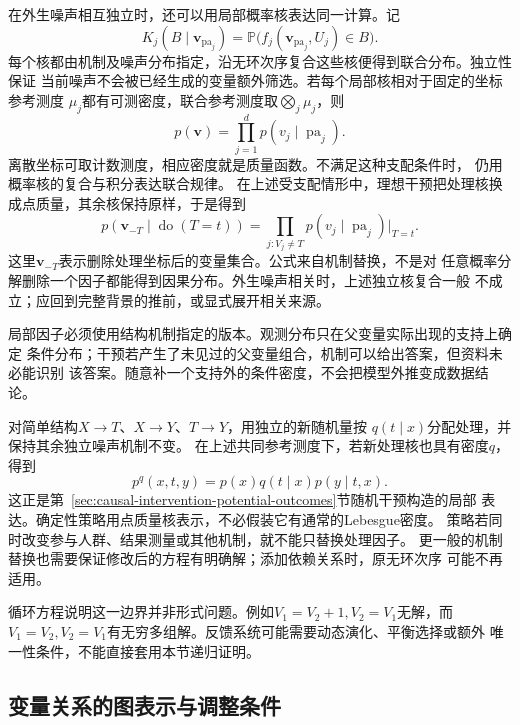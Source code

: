 在外生噪声相互独立时，还可以用局部概率核表达同一计算。记
\[
  K_j(B\mid\bm v_{\operatorname{pa}_j})
  =
  \mathbb P\bigl(f_j(\bm v_{\operatorname{pa}_j},U_j)\in B\bigr).
\]
每个核都由机制及噪声分布指定，沿无环次序复合这些核便得到联合分布。独立性保证
当前噪声不会被已经生成的变量额外筛选。若每个局部核相对于固定的坐标参考测度
\(\mu_j\)都有可测密度，联合参考测度取\(\bigotimes_j\mu_j\)，则
\[
  p(\bm v)=\prod_{j=1}^d p(v_j\mid\operatorname{pa}_j).
\]
离散坐标可取计数测度，相应密度就是质量函数。不满足这种支配条件时，
仍用概率核的复合与积分表达联合规律。
在上述受支配情形中，理想干预把处理核换成点质量，其余核保持原样，于是得到
\begin{equation}
  p(\bm v_{-T}\mid\operatorname{do}(T=t))
  =
  \prod_{j:V_j\ne T}
  p(v_j\mid\operatorname{pa}_j)\big|_{T=t}.
  \label{eq:causal-truncated-factorization}
\end{equation}
这里\(\bm v_{-T}\)表示删除处理坐标后的变量集合。公式来自机制替换，不是对
任意概率分解删除一个因子都能得到因果分布。外生噪声相关时，上述独立核复合一般
不成立；应回到完整背景的推前，或显式展开相关来源。

局部因子必须使用结构机制指定的版本。观测分布只在父变量实际出现的支持上确定
条件分布；干预若产生了未见过的父变量组合，机制可以给出答案，但资料未必能识别
该答案。随意补一个支持外的条件密度，不会把模型外推变成数据结论。

对简单结构\(X\to T\)、\(X\to Y\)、\(T\to Y\)，用独立的新随机量按
\(q(t\mid x)\)分配处理，并保持其余独立噪声机制不变。
在上述共同参考测度下，若新处理核也具有密度\(q\)，得到
\begin{equation}
  p^q(x,t,y)=p(x)q(t\mid x)p(y\mid t,x).
  \label{eq:causal-stochastic-intervention}
\end{equation}
这正是第~\ref{sec:causal-intervention-potential-outcomes}节随机干预构造的局部
表达。确定性策略用点质量核表示，不必假装它有通常的Lebesgue密度。
策略若同时改变参与人群、结果测量或其他机制，就不能只替换处理因子。
更一般的机制替换也需要保证修改后的方程有明确解；添加依赖关系时，原无环次序
可能不再适用。

循环方程说明这一边界并非形式问题。例如\(V_1=V_2+1,V_2=V_1\)无解，而
\(V_1=V_2,V_2=V_1\)有无穷多组解。反馈系统可能需要动态演化、平衡选择或额外
唯一性条件，不能直接套用本节递归证明。

\subsection{变量关系的图表示与调整条件}
\label{sec:causal-graph-adjustment}

